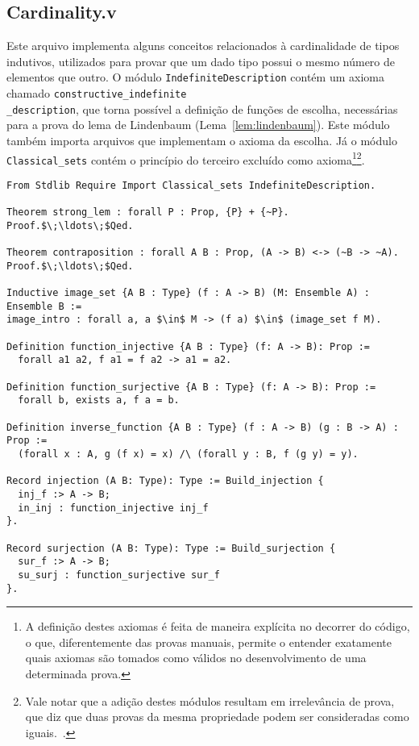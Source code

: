     \subsection{Cardinality.v}\label{sec:cardinality}

        Este arquivo implementa alguns conceitos relacionados à cardinalidade de tipos indutivos, utilizados para provar que um dado tipo possui o mesmo número de elementos que outro. O módulo \texttt{IndefiniteDescription} contém um axioma chamado \texttt{constructive\_indefinite\\\_description}, que torna possível a definição de funções de escolha, necessárias para a prova do lema de Lindenbaum (Lema~\ref{lem:lindenbaum}). Este módulo também importa arquivos que implementam o axioma da escolha. Já o módulo \texttt{Classical\_sets} contém o princípio do terceiro excluído como axioma\footnote{A definição destes axiomas é feita de maneira explícita no decorrer do código, o que, diferentemente das provas manuais, permite o entender exatamente quais axiomas são tomados como válidos no desenvolvimento de uma determinada prova.}\footnote{Vale notar que a adição destes módulos resultam em irrelevância de prova, que diz que duas provas da mesma propriedade podem ser consideradas como iguais.~\cite{paulinmohring:hal-01094195}.}.

        \begin{lstlisting}[name=LFI, frame=single, language=coq]
From Stdlib Require Import Classical_sets IndefiniteDescription.

Theorem strong_lem : forall P : Prop, {P} + {~P}.
Proof.$\;\ldots\;$Qed. 

Theorem contraposition : forall A B : Prop, (A -> B) <-> (~B -> ~A).
Proof.$\;\ldots\;$Qed.

Inductive image_set {A B : Type} (f : A -> B) (M: Ensemble A) : Ensemble B :=
image_intro : forall a, a $\in$ M -> (f a) $\in$ (image_set f M).

Definition function_injective {A B : Type} (f: A -> B): Prop :=
  forall a1 a2, f a1 = f a2 -> a1 = a2.

Definition function_surjective {A B : Type} (f: A -> B): Prop :=
  forall b, exists a, f a = b.
  
Definition inverse_function {A B : Type} (f : A -> B) (g : B -> A) : Prop :=
  (forall x : A, g (f x) = x) /\ (forall y : B, f (g y) = y).

Record injection (A B: Type): Type := Build_injection {
  inj_f :> A -> B;
  in_inj : function_injective inj_f
}.

Record surjection (A B: Type): Type := Build_surjection {
  sur_f :> A -> B;
  su_surj : function_surjective sur_f
}.
          \end{lstlisting}

